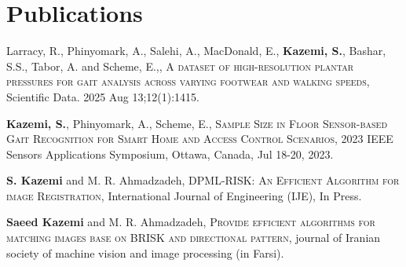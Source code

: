 \section{ Publications}

{Larracy, R., Phinyomark, A., Salehi, A., MacDonald, E., \textbf{Kazemi, S.}, Bashar, S.S., Tabor, A. and Scheme, E.,, 
\textsc{A dataset of high-resolution plantar pressures for gait analysis across varying footwear and walking speeds,} Scientific Data. 2025 Aug 13;12(1):1415.}


{\textbf{Kazemi, S.}, Phinyomark, A., Scheme, E., 
\textsc{Sample Size in Floor Sensor-based Gait Recognition for Smart Home and Access Control Scenarios,} 2023 IEEE Sensors Applications Symposium, Ottawa, Canada, Jul 18-20, 2023.}


{\textbf{S. Kazemi} and M. R. Ahmadzadeh, 
\textsc{DPML-RISK: An Efficient Algorithm for image Registration,} International Journal of Engineering (IJE), In Press.}

{\textbf{Saeed Kazemi} and M. R. Ahmadzadeh, 
\textsc{Provide efficient algorithms for matching images base on BRISK and directional pattern}, journal of Iranian society of machine vision and image processing (in Farsi).}







